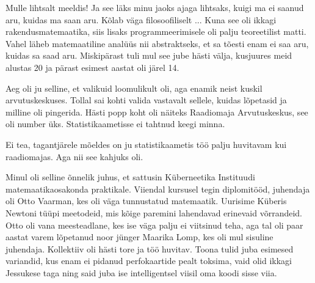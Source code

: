 
Mulle lihtsalt meeldis! Ja see läks minu jaoks ajaga 
lihtsaks, kuigi ma ei saanud aru, kuidas ma saan 
aru. Kõlab väga filosoofiliselt ... Kuna see oli ikkagi rakendusmatemaatika, siis 
lisaks programmeerimisele oli palju teoreetilist matti. Vahel läheb matemaatiline analüüs nii abstraktseks, et sa 
tõesti enam ei saa aru, kuidas sa saad aru. Miskipärast tuli mul see jube hästi välja, kusjuures meid alustas 20 
ja pärast esimest aastat oli järel 14. 


Aeg oli ju selline, et valikuid loomulikult oli, aga enamik neist kuskil arvutuskeskuses. Tollal sai
kohti valida vastavalt sellele, kuidas lõpetasid ja milline oli 
pingerida. Hästi popp koht oli näiteks Raadiomaja 
Arvutuskeskus, see oli number üks. 
Statistikaametisse ei tahtnud keegi minna.


Ei tea, tagantjärele mõeldes on ju
statistikaametis töö palju huvitavam kui raadiomajas. Aga nii see 
kahjuks oli.

Minul oli selline õnnelik juhus, et sattusin Küberneetika 
Instituudi matemaatikaosakonda praktikale. Viiendal kursusel tegin 
diplomitööd, juhendaja oli Otto Vaarman, kes oli väga tunnustatud matemaatik. Uurisime Küberis Newtoni tüüpi meetodeid, mis kõige paremini 
lahendavad erinevaid võrrandeid. Otto oli vana meesteadlane, kes ise 
väga palju ei viitsinud teha, aga tal oli paar 
aastat varem lõpetanud noor jünger Maarika Lomp, kes oli 
mul sisuline juhendaja. Kollektiiv oli hästi tore ja töö 
huvitav. Toona tulid juba esimesed variandid, kus enam ei 
pidanud perfokaartide pealt toksima, vaid olid ikkagi 
Jessukese taga ning said juba ise intelligentsel viisil oma 
koodi sisse viia.

